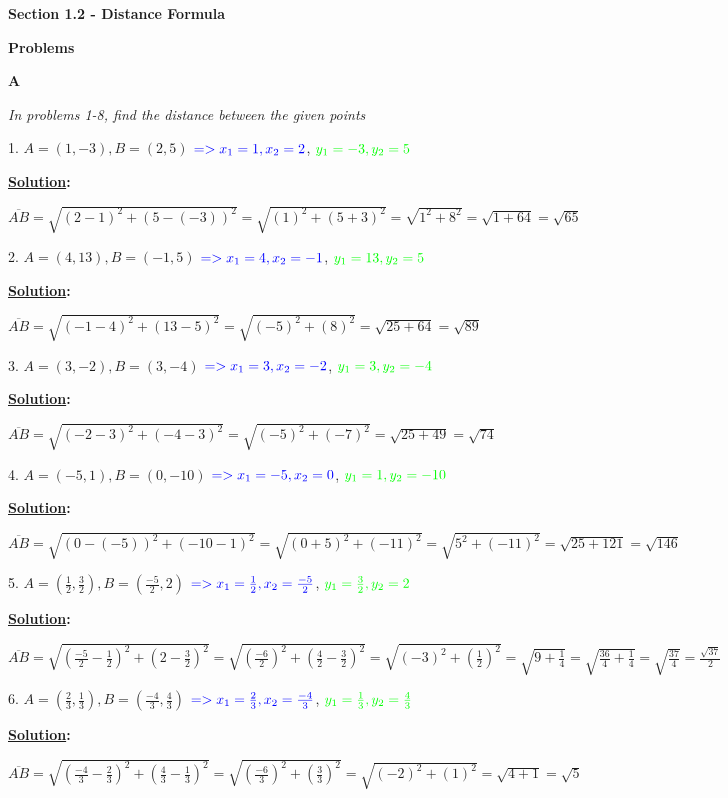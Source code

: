 \documentclass[10pt,letterpaper]{article}
\begin{document}
\textbf{Section 1.2 - Distance Formula}

\textbf{Problems}

\textbf{A}

\textit{In problems 1-8, find the distance between the given points}

1. $A=(1,-3), B=(2,5)$ $\color{blue} => x_1=1, x_2=2$, $\color{green}y_1=-3, y_2=5 $

\textbf{\underline {Solution}:}

$\overline{AB}=\sqrt{(2-1)^2+(5-(-3))^2}=\sqrt{(1)^2+(5+3)^2}=\sqrt{1^2+8^2}=\sqrt{1+64}=\sqrt{65}$

2. $A=(4,13), B=(-1,5)$ $\color{blue} => x_1 =4, x_2=-1$, $\color{green}y_1=13, y_2=5 $

\textbf{\underline {Solution}:}

$\overline{AB}=\sqrt{(-1-4)^2+(13-5)^2}=\sqrt{(-5)^2+(8)^2}=\sqrt{25+64}=\sqrt{89}$

3. $A=(3, -2), B=(3, -4)$ $\color{blue} => x_1 =3, x_2=-2$, $\color{green}y_1=3, y_2=-4 $

\textbf{\underline {Solution}:}

$\overline{AB}=\sqrt{(-2-3)^2 + (-4-3)^2}=\sqrt{(-5)^2+(-7)^2}=\sqrt{25+49}=\sqrt{74}$

4. $A=(-5, 1), B=(0, -10)$ $\color{blue} => x_1=-5, x_2=0$, $\color{green}y_1=1, y_2=-10 $

\textbf{\underline {Solution}:}

$\overline{AB}=\sqrt{(0-(-5))^2+(-10-1)^2}=\sqrt{(0+5)^2+(-11)^2}=\sqrt{5^2+(-11)^2}=\sqrt{25+121}=\sqrt{146}$

5. $A=(\frac{1}{2}, \frac{3}{2}), B=(\frac{-5}{2}, 2)$ $\color{blue} => x_1=\frac{1}{2}, x_2=\frac{-5}{2}$, $\color{green}y_1=\frac{3}{2}, y_2=2 $

\textbf{\underline {Solution}:}

$\overline{AB}=\sqrt{(\frac{-5}{2}-\frac{1}{2})^2+(2-\frac{3}{2})^2}=\sqrt{(\frac{-6}{2})^2+(\frac{4}{2}-\frac{3}{2})^2}=\sqrt{(-3)^2+(\frac{1}{2})^2}=\sqrt{9+\frac{1}{4}}=\sqrt{\frac{36}{4}+\frac{1}{4}}=\sqrt{\frac{37}{4}}=\frac{\sqrt{37}}{2}$

6. $A=(\frac{2}{3}, \frac{1}{3}), B=(\frac{-4}{3}, \frac{4}{3})$ $\color{blue} => x_1=\frac{2}{3}, x_2=\frac{-4}{3}$, $\color{green}y_1=\frac{1}{3}, y_2=\frac{4}{3} $

\textbf{\underline {Solution}:}

$\overline{AB}=\sqrt{(\frac{-4}{3}-\frac{2}{3})^2+(\frac{4}{3}-\frac{1}{3})^2}=\sqrt{(\frac{-6}{3})^2+(\frac{3}{3})^2}=\sqrt{(-2)^2+(1)^2}=\sqrt{4+1}=\sqrt{5}$
\end{document}
